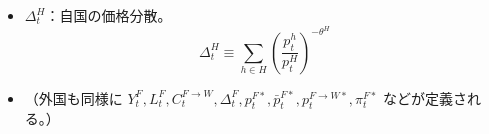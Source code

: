 \begin{itemize}
\begin{equation}
            B_t^{F*}\equiv-(N/M)(B_t^H/e_t^{/*})
        \end{equation}
        （世界全体の債券市場均衡\(Nb_t^{h\to F}+Me_t^{/*}b_t^{f\to F*}=0\)より導出される定義）
    \item
    \label{itm:chapter3_definitions_variables_endogenous_aggregate_Delta_H}
        \(\Delta_t^H\)：自国の価格分散。
        \begin{equation}
        \label{form:chapter3_definitions_variables_endogenous_aggregate_Delta_H_def}
            \Delta_t^H\equiv\sum_{h\in H}\left(\frac{p_t^h}{p_t^H}\right)^{-\theta^H}
        \end{equation}
    \item
    \label{itm:chapter3_definitions_variables_endogenous_aggregate_foreign}
        （外国も同様に
        \(Y_t^F,L_t^F,C_t^{F\to W},\Delta_t^F,p_t^{F*},\bar{p}_t^{F*},p_t^{F\to W*},\pi_t^{F*}\)
        などが定義される。）
\end{itemize}

